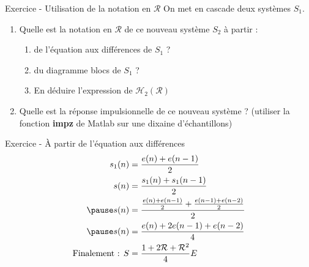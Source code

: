 \documentclass[a4paper,11pt]{beamer}
\newcounter{exampleBlockCounter}
\begin{document}
\begin{frame}
\begin{exampleblock}{Exercice  - Utilisation de la
notation en $\mathcal{R}$}
\justifying
On met en cascade deux systèmes $S_1$. 
\begin{enumerate}
\justifying
\item Quelle est la notation en $\mathcal{R}$ de ce nouveau système $S_2$ à
partir :
\begin{enumerate}	
	\item de l'équation aux différences de $S_1$ ?
	\item du diagramme blocs de $S_1$ ?
	\item En déduire l'expression de $\mathcal{H}_{2}(\mathcal{R})$
\end{enumerate}
\item Quelle est la réponse impulsionnelle de ce nouveau système ? (utiliser
	  la fonction \textbf{impz} de Matlab sur une dixaine d'échantillons)
\end{enumerate}
\end{exampleblock}
\end{frame}

\begin{frame}
\begin{exampleblock}{Exercice  - À partir de l'équation aux différences}
\[
\begin{aligned}
	s_1(n) &= \frac{e(n) + e(n-1)}{2}\\
	s(n) &= \frac{s_1(n) + s_1(n-1)}{2}\\
	\pause
	s(n) &= \frac{\frac{e(n) + e(n-1)}{2} + \frac{e(n-1) + e(n-2)}{2}}{2}\\
	\pause
	s(n) &= \frac{e(n) + 2e(n-1) + e(n-2)}{4}\\
	\text{Finalement : }S &= \frac{1 + 2\mathcal{R} + \mathcal{R}^2}{4} E
\end{aligned}
\]
\end{exampleblock}
\end{frame}
\end{document}
